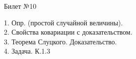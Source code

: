 \documentclass[preview]{standalone}
\begin{document}
 
\begin{center} {\Large Билет №10} \end{center} 

1.  Опр. (простой случайной величины).\\

2.  Свойства ковариации с доказательством.\\

3.  Теорема Слуцкого. Доказательство.\\

4. Задача. К.1.3\\
\end{document}
